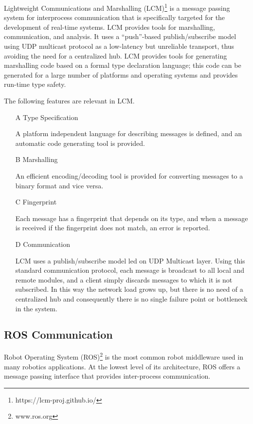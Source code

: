 Lightweight Communications and Marshalling (LCM)\footnote{https://lcm-proj.github.io/} \cite{lcm-iros2010} is a message passing system for interprocess communication that is specifically targeted for the development of real-time systems. LCM provides tools for marshalling, communication, and analysis. It uses a “push”-based publish/subscribe model using UDP multicast protocol as a low-latency but unreliable transport, thus avoiding the need for a centralized hub. LCM provides tools for generating marshalling code based on a formal type declaration language; this code can be generated for a large number of platforms and operating systems and provides run-time type safety.

The following features are relevant in LCM.
	\begin{itemize}
	
	\item[A] Type Specification
	
	A platform independent language for describing messages is defined, and an automatic code generating tool is provided.
	
	\item[B] Marshalling
	
	An efficient encoding/decoding tool is provided for converting messages to a binary format and vice versa. 
	
	\item[C] Fingerprint 
	
	Each message has a fingerprint that depends on its type, and when a message is received if the fingerprint does not match, an error is reported.
	
	\item[D] Communication
	
	LCM uses a publish/subscribe model led on UDP Multicast layer. Using this standard communication protocol, each message is broadcast to all local and remote modules, and a client simply discards messages to which it is not subscribed. In this way the network load grows up, but there is no need of a centralized hub and consequently there is no single failure point or bottleneck in the system.

	\end{itemize}


\subsection{ROS Communication}

Robot Operating System (ROS)\footnote{www.ros.org} is the most common robot middleware used in many robotics applications.
At the lowest level of its architecture, ROS offers a message passing interface that provides inter-process communication.

